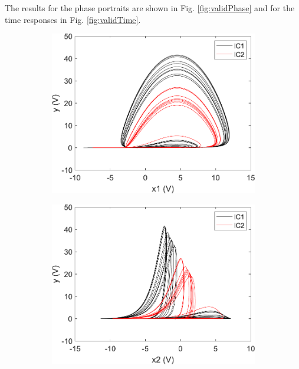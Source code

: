 The results for the phase portraits are shown in Fig. \ref{fig:validPhase} and for the time responses in Fig. \ref{fig:validTime}.
\begin{figure}
        \centering
        \begin{subfigure}[b]{0.3\textwidth}
            \centering
            \includegraphics[scale=0.35]{figs/yvsx1Valid.pdf}
        \end{subfigure}
        \begin{subfigure}[b]{0.3\textwidth}  
            \centering 
            \includegraphics[scale=0.35]{figs/yvsx2Valid.pdf}
        \end{subfigure}

\end{figure}
